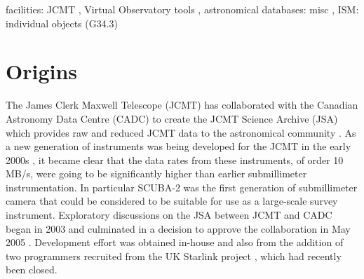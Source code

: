 \documentclass[final,authoryear,5p,times,twocolumn]{elsarticle}
\begin{document}
\begin{frontmatter}
\begin{abstract}
\end{abstract}

\begin{keyword}


facilities: JCMT \sep
Virtual Observatory tools \sep
astronomical databases: misc \sep
ISM: individual objects (G34.3)

\end{keyword}

\end{frontmatter}


\newcommand{\mnras}{MNRAS}
\newcommand{\aap}{A\&A}
\newcommand{\aaps}{A\&AS}
\newcommand{\pasp}{PASP}
\newcommand{\apj}{ApJ}
\newcommand{\apjs}{ApJS}
\newcommand{\qjras}{QJRAS}
\newcommand{\an}{Astron.\ Nach.}
\newcommand{\ijimw}{Int.\ J.\ Infrared \& Millimeter Waves}
\newcommand{\procspie}{Proc.\ SPIE}
\newcommand{\aspconf}{ASP Conf. Ser.}



\newcommand{\ascl}[1]{\href{http://www.ascl.net/#1}{ascl:#1}}


\section{Origins}

The James Clerk Maxwell Telescope (JCMT) has collaborated with the Canadian Astronomy Data Centre (CADC) to
create the JCMT Science Archive (JSA) which provides raw and reduced JCMT data to the astronomical community
\citep{2008SPIE.7016E..16G,2008ASPC..394..450E,2008ASPC..394..135G,2011ASPC..442..203E}.
As a new generation of instruments was being developed for the JCMT in
the early 2000s \citep[HARP/ACSIS \& SCUBA-2;][]{2000ASPC..217...33D,2003SPIE.4855....1H},
it became clear that
the data rates from these instruments, of order 10\,MB/s, were going to be significantly
higher than earlier submillimeter instrumentation. In
particular SCUBA-2 was the first generation of submillimeter camera
that could be considered to be suitable for use as a large-scale
survey instrument. Exploratory discussions on the JSA between JCMT and CADC
began in 2003 and culminated in a decision to approve the
collaboration in May 2005 \citep{2005JCMTN23}. Development effort was
obtained in-house and also from the addition of two programmers recruited from
the UK Starlink project \citep{1982QJRAS..23..485D}, which had recently been closed.
\end{document}

